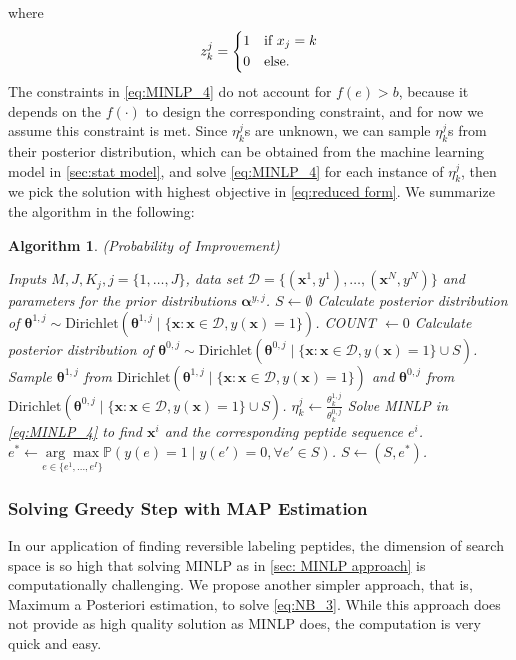 \documentclass[11pt]{article}
\newcommand{\Prob}{\mathbb{P}}
\newtheorem{Algorithm}{Algorithm}
\begin{document}
where
\begin{equation*}
z^j_k = \begin{dcases}
        1 & \text{if $x_j = k$}\\
        0 & \text{else}.
\end{dcases}
\end{equation*}
The constraints in \eqref{eq:MINLP_4} do not account for $f(e) > b$, because it depends on
the $f(\cdot)$ to design the corresponding constraint, and for now we assume this
constraint is met. Since $\eta^j_k$s are unknown, we can sample $\eta^j_k$s from their posterior 
distribution, which can be obtained from the machine learning model in \ref{sec:stat model},
and solve \eqref{eq:MINLP_4} for each instance of $\eta^j_k$, then we pick
the solution with highest objective in \eqref{eq:reduced form}. We summarize 
the algorithm in the following:
\begin{Algorithm}(Probability of Improvement) \label{algo1}
\begin{algorithmic}[1]
  \REQUIRE Inputs $M, J, K_j, j = \{1, \ldots, J\}$, data set $\mathcal{D} = 
  \{(\bm{x}^1, y^1), \ldots, (\bm{x}^N, y^N)\}$ and parameters for the prior 
  distributions $\bm{\alpha}^{y, j}$.
  \STATE $S \leftarrow \emptyset $
  \STATE Calculate posterior distribution of $\bm{\theta}^{1, j} \sim 
  \text{Dirichlet} (\bm{\theta}^{1, j} \mid \{\bm{x}: \bm{x} \in \mathcal{D}, 
  y(\bm{x}) = 1\})$.
    \STATE COUNT $\leftarrow 0$
    \STATE Calculate posterior distribution of $\bm{\theta}^{0, j} \sim 
    \text{Dirichlet} (\bm{\theta}^{0, j} \mid \{\bm{x}: \bm{x} \in \mathcal{D}, 
    y(\bm{x}) = 1\} \cup S)$.
      \STATE Sample $\bm{\theta}^{1, j}$ from $\text{Dirichlet} (\bm{\theta}^{1, j} 
      \mid \{\bm{x}: \bm{x} \in \mathcal{D}, y(\bm{x}) = 1\})$ and $\bm{\theta}^{0, j}$
      from $\text{Dirichlet} (\bm{\theta}^{0, j} \mid \{\bm{x}: \bm{x} \in \mathcal{D}, 
      y(\bm{x}) = 1\} \cup S)$.
      \STATE $\eta^j_k \leftarrow \frac{\theta^{1, j}_k}{\theta^{0, j}_k}$
      \STATE Solve MINLP in \eqref{eq:MINLP_4} to find $\bm{x}^i$ and the corresponding
      peptide sequence $e^i$.
    \ENDFOR
    \STATE $e^* \leftarrow \underset{e \in \{e^1, \ldots, e^I\}}
    {\arg \max} \Prob (y(e) = 1 \mid y(e') = 0, \forall e' \in S)$.
    \STATE $S \leftarrow (S, e^*)$.
  \ENDFOR
\end{algorithmic}
\end{Algorithm}

\subsubsection{Solving Greedy Step with MAP Estimation}
In our application of finding reversible labeling peptides, the dimension of search space is so high that solving MINLP as in \ref{sec: MINLP approach} is computationally challenging. We propose another simpler approach, that is, Maximum a Posteriori estimation, to solve \eqref{eq:NB_3}. While this approach does not provide as high quality solution as MINLP does, the computation is very quick and easy. 
\end{document}
